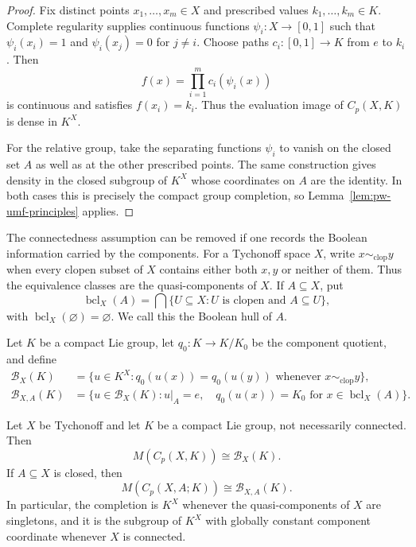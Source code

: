 \begin{proof}
Fix distinct points \(x_1,\ldots,x_m\in X\) and prescribed values
\(k_1,\ldots,k_m\in K\). Complete regularity supplies continuous functions
\(\psi_i:X\to[0,1]\) such that
\(\psi_i(x_i)=1\) and \(\psi_i(x_j)=0\) for \(j\ne i\). Choose paths
\(c_i:[0,1]\to K\) from \(e\) to \(k_i\). Then
\[
f(x)=\prod_{i=1}^m c_i(\psi_i(x))
\]
is continuous and satisfies \(f(x_i)=k_i\). Thus the evaluation image of
\(C_p(X,K)\) is dense in \(K^X\).

For the relative group, take the separating functions \(\psi_i\) to vanish on
the closed set \(A\) as well as at the other prescribed points. The same
construction gives density in the closed subgroup of \(K^X\) whose coordinates
on \(A\) are the identity. In both cases this is precisely the compact group
completion, so Lemma~\ref{lem:pw-umf-principles} applies.
\end{proof}

\medskip
The connectedness assumption can be removed if one records the Boolean
information carried by the components. For a Tychonoff space \(X\), write
\(x\sim_{\mathrm{clop}}y\) when every clopen subset of \(X\) contains either
both \(x,y\) or neither of them. Thus the equivalence classes are the
quasi-components of \(X\). If \(A\subseteq X\), put
\[
 \operatorname{bcl}_X(A)
 =\bigcap\{U\subseteq X:U\text{ is clopen and }A\subseteq U\},
\]
with \(\operatorname{bcl}_X(\varnothing)=\varnothing\). We call this the
Boolean hull of \(A\).

Let \(K\) be a compact Lie group, let \(q_0:K\to K/K_0\) be the component
quotient, and define
\begin{align*}
 \mathcal B_X(K)
 &=\{u\in K^X:q_0(u(x))=q_0(u(y))
          \text{ whenever }x\sim_{\mathrm{clop}}y\},\\
 \mathcal B_{X,A}(K)
 &=\{u\in\mathcal B_X(K):u|_A=e,\quad
       q_0(u(x))=K_0\text{ for }x\in\operatorname{bcl}_X(A)\}.
\end{align*}

\begin{theorem}\label{thm:pw-cp-disconnected-umf}
Let \(X\) be Tychonoff and let \(K\) be a compact Lie group, not necessarily
connected. Then
\[
 M(C_p(X,K))\cong\mathcal B_X(K).
\]
If \(A\subseteq X\) is closed, then
\[
 M(C_p(X,A;K))\cong\mathcal B_{X,A}(K).
\]
In particular, the completion is \(K^X\) whenever the quasi-components of
\(X\) are singletons, and it is the subgroup of \(K^X\) with globally
constant component coordinate whenever \(X\) is connected.
\end{theorem}

